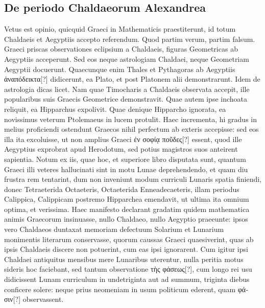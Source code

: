 \subsection{De periodo Chaldaeorum Alexandrea}
Vetus est opinio, quicquid Graeci in Mathematicis praestiterunt,
id totum Chaldaeis et Aegyptiis accepto referendum.
Quod partim verum, partim falsum.
Graeci priscas observationes
eclipsium %
 a Chaldaeis, figuras Geometricas ab Aegyptiis acceperunt.
Sed eos neque astrologiam Chaldaei, neque Geometriam Aegyptii docuerunt.
Quaecunque enim Thales et Pythagoras ab Aegyptiis
 \textgreek{ἀναπόδεικτα[?]}
didicerunt, ea Plato, et post Platonem alii demonstrarunt.
Idem de astrologia dicas licet.
Nam quae Timocharis a Chaldaeis observata
accepit, ille popularibus suis Graecis Geometrice demonstravit.
Quae autem ipse inchoata reliquit, ea Hipparchus expolivit.
Quae
denique Hipparcho ignorata, ea novissimus veterum Ptolemaeus
in lucem protulit.
Haec incrementa, hi gradus in melius proficiendi
ostendunt Graecos nihil perfectum ab exteris accepisse: sed eos
illa ita excoluisse, ut non amplius Graeci
 \textgreek{ἐν σοφίᾳ ποῦδες[?]} essent, quod
ille Aegyptius exprobrat apud Herodotum, sed potius magistros suos
anteirent sapientia.
Notum ex iis, quae hoc, et superiore libro disputata
sunt, quantum Graeci illi veteres hallucinati sint in motu Lunae
deprehendendo, et quam diu frustra rem tentarint, dum non inveniunt
modum curriculi Lunaris spatia finiendi, donec Tetraeterida
Octaeteris, Octaeterida Enneadecaeteris, illam periodus Calippica,
Calippicam postremo Hipparchea emendavit, ut ultima ita omnium
optima, et verissima.
Haec manifesto declarant gradatim
quidem mathematica animis Graecorum insinuasse, nullo Chaldaeo,
nullo Aegyptio praeeunte: ipsos vero Chaldaeos duntaxat memoriam
defectuum Solarium et Lunarium monimentis literarum
conservasse, quorum caussas Graeci quaesiverint, quas ab ipsis
Chaldaeis discere non potuerint, cum eas ipsi ignorarent.
Cum igitur
ipsi Chaldaei antiquitus mensibus mere Lunaribus uterentur,
nulla peritia motus sideris hoc faciebant, sed tantum observatione
\textgreek{τὴς φάσεως[?]},
 cum longo rei usu didicissent Lunam curriculum in undetriginta
aut ad summum, triginta diebus conficere solere: neque prius neomeniam
in usum politicum ederent, quam \textgreek{φάσιν[?]} observassent.

